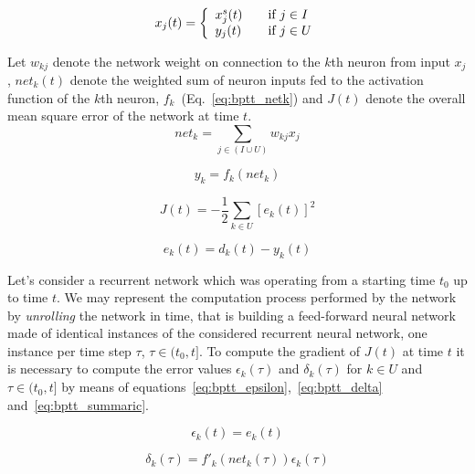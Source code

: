 \begin{equation}
x_j(t) = \left\{
\begin{array}{l l}
	x^{s}_{j}(t)	& \quad \text{if $j \in I$} \\
	y_j(t)	& \quad \text{if $j \in U$}\\
\end{array} \right.
\label{eq:bptt_indices}
\end{equation}

\noindent Let $w_{kj}$ denote the network weight on connection to the $k$th neuron from input $x_j$, $net_k(t)$ denote the weighted sum of neuron inputs fed to the activation function of the $k$th neuron, $f_k$~(Eq.~\ref{eq:bptt_netk}) and $J(t)$ denote the overall mean square error of the network at time $t$.
\begin{equation}
net_k = \sum_{j \in (I \cup U)} w_{kj} x_j
\label{eq:bptt_netk}
\end{equation}

\begin{equation}
y_k = f_k(net_k)
\label{eq:bptt_f}
\end{equation}

\begin{equation}
J(t) = -\frac{1}{2} \sum_{k \in U} [e_k(t)]^2
\label{eq:bptt_j}
\end{equation}

\begin{equation}
e_k(t) = d_k(t) - y_k(t)
\label{eq:bptt_e}
\end{equation}

\noindent Let's consider a recurrent network which was operating from a starting time $t_0$ up to time $t$. We may represent the computation process performed by the network by \emph{unrolling} the network in time, that is building a feed-forward neural network made of identical instances of the considered recurrent neural network, one instance per time step $\tau$, $\tau \in (t_0, t]$. To compute the gradient of $J(t)$ at time $t$ it is necessary to compute the error values $\epsilon_k(\tau)$ and $\delta_k(\tau)$ for $k \in U$ and $\tau \in (t_0, t]$ by means of equations~\ref{eq:bptt_epsilon},~\ref{eq:bptt_delta} and~\ref{eq:bptt_summaric}.

\begin{equation}
\epsilon_k(t) = e_k(t)
\label{eq:bptt_epsilon}
\end{equation}

\begin{equation}
\delta_k(\tau) = f'_k(net_k(\tau))\epsilon_k(\tau)
\label{eq:bptt_delta}
\end{equation}

